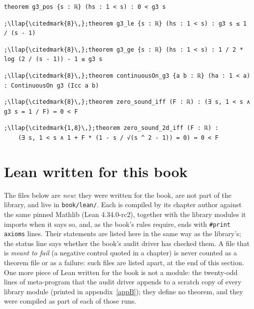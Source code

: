 \begin{lstlisting}[style=leancat]
theorem g3_pos {s : ℝ} (hs : 1 < s) : 0 < g3 s
\end{lstlisting}

\begin{lstlisting}[style=leancat]
;\llap{\citedmark{8}\,};theorem g3_le {s : ℝ} (hs : 1 < s) : g3 s ≤ 1 / (s - 1)
\end{lstlisting}

\begin{lstlisting}[style=leancat]
;\llap{\citedmark{8}\,};theorem g3_ge {s : ℝ} (hs : 1 < s) : 1 / 2 * log (2 / (s - 1)) - 1 ≤ g3 s
\end{lstlisting}

\begin{lstlisting}[style=leancat]
;\llap{\citedmark{8}\,};theorem continuousOn_g3 {a b : ℝ} (ha : 1 < a) : ContinuousOn g3 (Icc a b)
\end{lstlisting}

\begin{lstlisting}[style=leancat]
;\llap{\citedmark{8}\,};theorem zero_sound_iff (F : ℝ) : (∃ s, 1 < s ∧ g3 s = 1 / F) ↔ 0 < F
\end{lstlisting}

\begin{lstlisting}[style=leancat]
;\llap{\citedmark{1,8}\,};theorem zero_sound_2d_iff (F : ℝ) :
    (∃ s, 1 < s ∧ 1 + F * (1 - s / √(s ^ 2 - 1)) = 0) ↔ 0 < F
\end{lstlisting}

\section{Lean written for this book}\label{appA:new}
The files below are \emph{new}: they were written for the book, are not part of the  library, and live in \texttt{book/lean/}. Each is compiled by its chapter author against the same pinned Mathlib (Lean 4.34.0-rc2), together with the library modules it imports when it says so, and, as the book's rules require, ends with \texttt{\#print axioms} lines. Their statements are listed here in the same way as the library's; the status line says whether the book's audit driver has checked them. A file that is \emph{meant to fail} (a negative control quoted in a chapter) is never counted as a theorem file or as a failure: such files are listed apart, at the end of this section. One more piece of Lean written for the book is not a module: the twenty-odd lines of meta-program that the audit driver appends to a scratch copy of every library module (printed in appendix~\ref{appB}); they define no theorem, and they were compiled as part of each of those runs.
